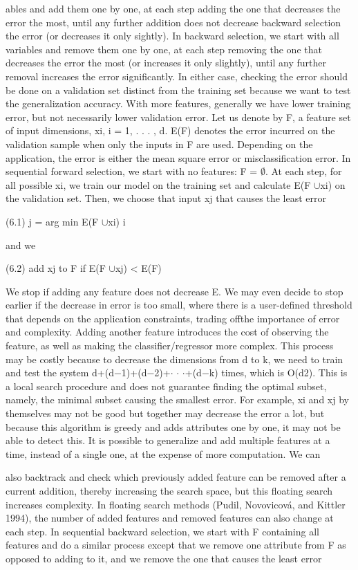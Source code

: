 ables and add them one by one, at each step adding the one that decreases the error the most, until any further addition does not decrease backward selection the error (or decreases it only sightly). In backward selection, we start with all variables and remove them one by one, at each step removing the one that decreases the error the most (or increases it only slightly), until any further removal increases the error significantly. In either case, checking the error should be done on a validation set distinct from the training set because we want to test the generalization accuracy. With more features, generally we have lower training error, but not necessarily lower validation error. Let us denote by F, a feature set of input dimensions, xi, i = 1, . . . , d. E(F) denotes the error incurred on the validation sample when only the inputs in F are used. Depending on the application, the error is either the mean square error or misclassification error. In sequential forward selection, we start with no features: F = $\emptyset$. At each step, for all possible xi, we train our model on the training set and calculate E(F $\cup$xi) on the validation set. Then, we choose that input xj that causes the least error

(6.1) j = arg min E(F $\cup$xi) i

and we

(6.2) add xj to F if E(F $\cup$xj) < E(F)

We stop if adding any feature does not decrease E. We may even decide to stop earlier if the decrease in error is too small, where there is a user-defined threshold that depends on the application constraints, trading offthe importance of error and complexity. Adding another feature introduces the cost of observing the feature, as well as making the classifier/regressor more complex. This process may be costly because to decrease the dimensions from d to k, we need to train and test the system d+(d$-$1)+(d$-$2)+$\cdot$ $\cdot$ $\cdot$+(d$-$k) times, which is O(d2). This is a local search procedure and does not guarantee finding the optimal subset, namely, the minimal subset causing the smallest error. For example, xi and xj by themselves may not be good but together may decrease the error a lot, but because this algorithm is greedy and adds attributes one by one, it may not be able to detect this. It is possible to generalize and add multiple features at a time, instead of a single one, at the expense of more computation. We can

also backtrack and check which previously added feature can be removed after a current addition, thereby increasing the search space, but this floating search increases complexity. In floating search methods (Pudil, Novovicová, and Kittler 1994), the number of added features and removed features can also change at each step. In sequential backward selection, we start with F containing all features and do a similar process except that we remove one attribute from F as opposed to adding to it, and we remove the one that causes the least error

